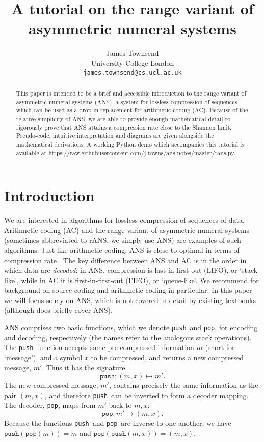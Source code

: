 \documentclass{article}
\author{
  James Townsend\\
  University College London\\
  \texttt{james.townsend@cs.ucl.ac.uk}
}
\title{A tutorial on the range variant of asymmetric numeral systems}
\theoremstyle{definition}
\newcommand{\push}{\texttt{push}}
\newcommand{\pop}{\texttt{pop}}
\begin{document}
\maketitle
\begin{abstract}
  This paper is intended to be a brief and accessible introduction to the range
  variant of asymmetric numeral systems (ANS), a system for lossless
  compression of sequences which can be used as a drop in replacement for
  arithmetic coding (AC). Because of the relative simplicity of ANS, we are
  able to provide enough mathematical detail to rigorously prove that ANS
  attains a compression rate close to the Shannon limit. Pseudo-code, intuitive
  interpretation and diagrams are given alongside the mathematical derivations.
  A working Python demo which accompanies this tutorial is available at
  \url{https://raw.githubusercontent.com/j-towns/ans-notes/master/rans.py}.
\end{abstract}


\section{Introduction}\label{sec:intro}
  We are interested in algorithms for lossless compression of sequences of
  data.  Arithmetic coding (AC) and the range variant of asymmetric numeral
  systems (sometimes abbreviated to rANS, we simply use ANS) are examples of
  such algorithms. Just like arithmetic coding, ANS is close to optimal in
  terms of compression rate \citep{witten1987, duda2009}. The key difference
  between ANS and AC is in the order in which data are \emph{decoded}: in ANS,
  compression is last-in-first-out (LIFO), or `stack-like', while in AC it is
  first-in-first-out (FIFO), or `queue-like'. We recommend
  \citet[Chapter~4-6]{mackay2003} for background on source coding and arithmetic
  coding in particular. In this paper we will focus solely on ANS, which is not
  covered in detail by existing textbooks (although \cite{mcanlis2016} does
  briefly cover ANS).

  ANS comprises two basic functions, which we denote \push\ and \pop, for
  encoding and decoding, respectively (the names refer to the analogous stack
  operations). The \push\ function accepts some pre-compressed information
  \(m\) (short for `message'), and a symbol \(x\) to be compressed, and returns
  a new compressed message, \(m'\). Thus it has the signature
  \begin{equation}
    \push:(m, x) \mapsto m'.
  \end{equation}
  The new compressed message, \(m'\), contains precisely the same information
  as the pair \((m, x)\), and therefore \push\ can be inverted to form a
  decoder mapping.  The decoder, \pop, maps from \(m'\) back to \(m, x\):
  \begin{equation}
    \pop:m' \mapsto (m, x).
  \end{equation}
  Because the functions \push\ and \pop\ are inverse to one another, we have
  \(\push(\pop(m))=m\) and \(\pop(\push(m, x)) = (m, x)\).
\end{document}
